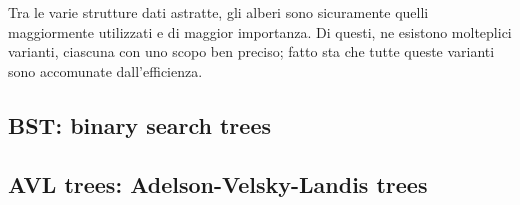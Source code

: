 \documentclass{subfiles}
\begin{document}
Tra le varie strutture dati astratte, gli alberi sono sicuramente quelli maggiormente utilizzati e di maggior importanza.
Di questi, ne esistono molteplici varianti, ciascuna con uno scopo ben preciso; fatto sta che tutte queste varianti sono accomunate dall'efficienza.

\subsection{BST: binary search trees}


\subsection{AVL trees: Adelson-Velsky-Landis trees}

\end{document}
